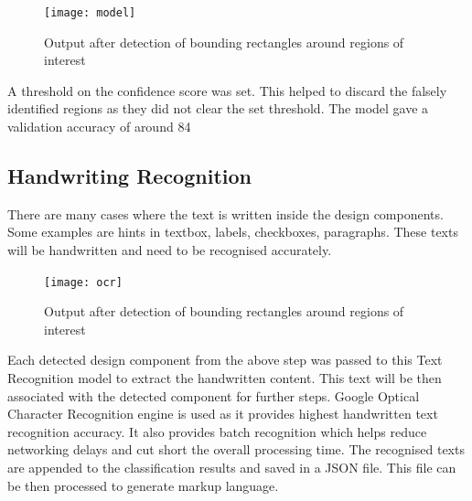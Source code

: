       \begin{figure}[H]
        \centering
        \texttt{[image: model]}
        \caption
        {Output after detection of bounding rectangles around regions of interest}
      \end{figure}

      A threshold on the confidence score was set. This helped to discard the falsely identified regions as they did not clear the set threshold.
      The model gave a validation accuracy of around 84%

      \subsection{ Handwriting Recognition}
        There are many cases where the text is written inside the design components. Some examples are hints in textbox, labels, checkboxes, paragraphs. These texts will be handwritten and need to be recognised accurately.

        \begin{figure}[H]
          \centering
          \texttt{[image: ocr]}
          \caption
          {Output after detection of bounding rectangles around regions of interest}
        \end{figure}

        Each detected design component from the above step was passed to this Text Recognition model to extract the handwritten content. This text will be then associated with the detected component for further steps. Google Optical Character Recognition engine is used as it provides highest handwritten text recognition accuracy. It also provides batch recognition which helps reduce networking delays and cut short the overall processing time.
        The recognised texts are appended to the classification results and saved in a JSON file. This file can be then processed to generate markup language.

